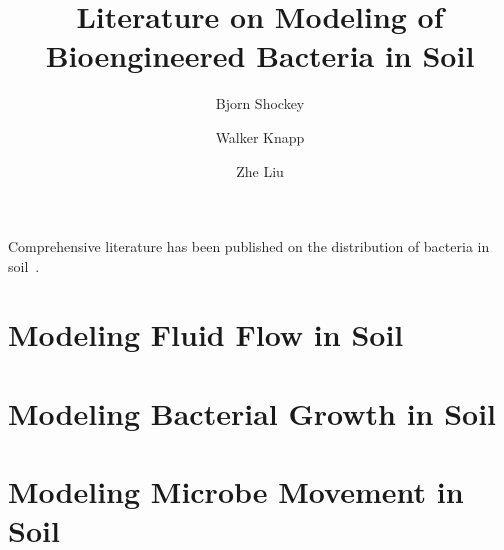 \documentclass[journal = bichaw, biochem=true]{achemso}
\title{Literature on Modeling of Bioengineered Bacteria in Soil}
\author[1]{Bjorn Shockey}
\author[1]{Walker Knapp}
\author[1]{Zhe Liu}
\affil[1]{College of William and Mary}
\begin{document}

    Comprehensive literature has been published on the distribution of bacteria in soil~\cite{TimsinaRameshChandra2021AMMf}.


    \section{Modeling Fluid Flow in Soil}\label{sec:modeling-fluid-flow-in-soil}

    \section{Modeling Bacterial Growth in Soil}\label{sec:modeling-bacterial-growth-in-soil}

    \section{Modeling Microbe Movement in Soil}\label{sec:modeling-microbe-movement-in-soil}

    
\end{document}
